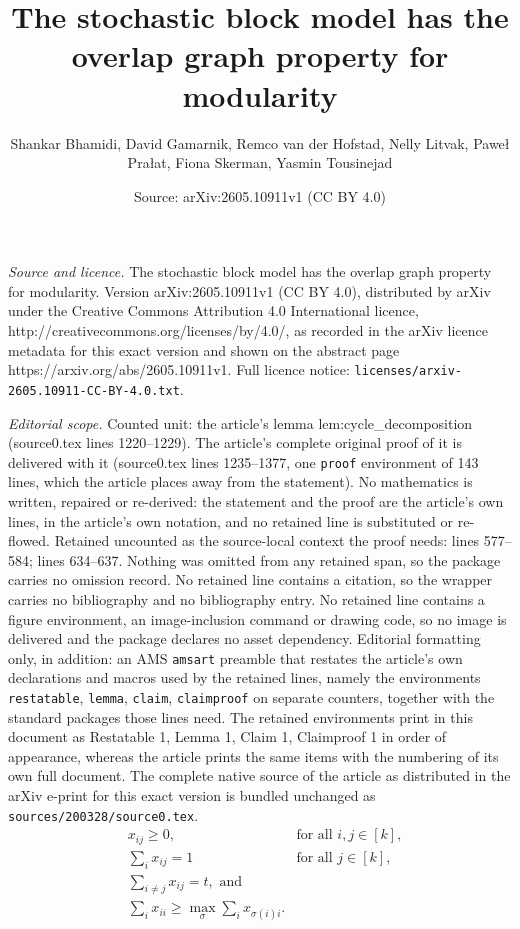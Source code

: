 \documentclass[10pt,a4paper]{amsart}
\title{The stochastic block model has the overlap graph property for modularity}
\author{Shankar Bhamidi, David Gamarnik, Remco van der Hofstad, Nelly Litvak, Pawe{\l} Pra{\l}at, Fiona Skerman, Yasmin Tousinejad}
\date{Source: arXiv:2605.10911v1 (CC BY 4.0)}
\begin{document}
\maketitle

\noindent\emph{Source and licence.} The stochastic block model has the overlap graph property for modularity. Version arXiv:2605.10911v1 (CC BY 4.0), distributed by arXiv under the Creative Commons Attribution 4.0 International licence, http://creativecommons.org/licenses/by/4.0/, as recorded in the arXiv licence metadata for this exact version and shown on the abstract page https://arxiv.org/abs/2605.10911v1. Full licence notice: \texttt{licenses/arxiv-2605.10911-CC-BY-4.0.txt}.\par\smallskip

\noindent\textit{Editorial scope.} Counted unit: the article's lemma lem:cycle\_decomposition (source0.tex lines 1220--1229). The article's complete original proof of it is delivered with it (source0.tex lines 1235--1377, one \texttt{proof} environment of 143 lines, which the article places away from the statement). No mathematics is written, repaired or re-derived: the statement and the proof are the article's own lines, in the article's own notation, and no retained line is substituted or re-flowed.  Retained uncounted as the source-local context the proof needs: lines 577--584; lines 634--637.  Nothing was omitted from any retained span, so the package carries no omission record.  No retained line contains a citation, so the wrapper carries no bibliography and no bibliography entry.  No retained line contains a figure environment, an image-inclusion command or drawing code, so no image is delivered and the package declares no asset dependency.  Editorial formatting only, in addition: an AMS \texttt{amsart} preamble that restates the article's own declarations and macros used by the retained lines, namely the environments \texttt{restatable}, \texttt{lemma}, \texttt{claim}, \texttt{claimproof} on separate counters, together with the standard packages those lines need.  The retained environments print in this document as Restatable 1, Lemma 1, Claim 1, Claimproof 1 in order of appearance, whereas the article prints the same items with the numbering of its own full document.  The complete native source of the article as distributed in the arXiv e-print for this exact version is bundled unchanged as \texttt{sources/200328/source0.tex}.
\begin{align}
\nonumber &x_{ij} \geq 0, &\mbox{for all $i,j \in [k]$},\\[0.5em]
%
\label{eq.def.X.orig} &\sum_i x_{ij}  =  1 &\mbox{for all $j \in [k]$},  \\
%
\nonumber &\sum_{i\neq j}x_{ij}  = t, \mbox{ and }\\
\nonumber &\sum_{i}x_{ii} \geq \max_{\sigma} \sum_i x_{\sigma(i)i}.
\end{align}
\end{document}
